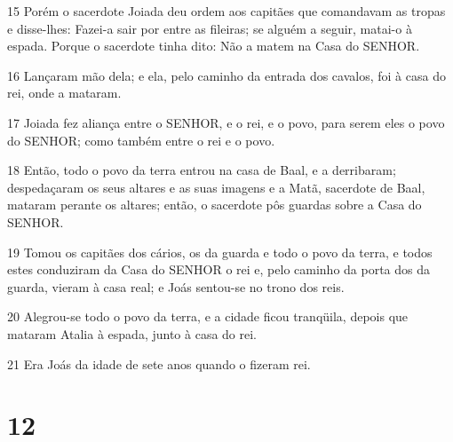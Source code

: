 \par 15 Porém o sacerdote Joiada deu ordem aos capitães que comandavam as tropas e disse-lhes: Fazei-a sair por entre as fileiras; se alguém a seguir, matai-o à espada. Porque o sacerdote tinha dito: Não a matem na Casa do SENHOR.
\par 16 Lançaram mão dela; e ela, pelo caminho da entrada dos cavalos, foi à casa do rei, onde a mataram.
\par 17 Joiada fez aliança entre o SENHOR, e o rei, e o povo, para serem eles o povo do SENHOR; como também entre o rei e o povo.
\par 18 Então, todo o povo da terra entrou na casa de Baal, e a derribaram; despedaçaram os seus altares e as suas imagens e a Matã, sacerdote de Baal, mataram perante os altares; então, o sacerdote pôs guardas sobre a Casa do SENHOR.
\par 19 Tomou os capitães dos cários, os da guarda e todo o povo da terra, e todos estes conduziram da Casa do SENHOR o rei e, pelo caminho da porta dos da guarda, vieram à casa real; e Joás sentou-se no trono dos reis.
\par 20 Alegrou-se todo o povo da terra, e a cidade ficou tranqüila, depois que mataram Atalia à espada, junto à casa do rei.
\par 21 Era Joás da idade de sete anos quando o fizeram rei.

\chapter{12}


